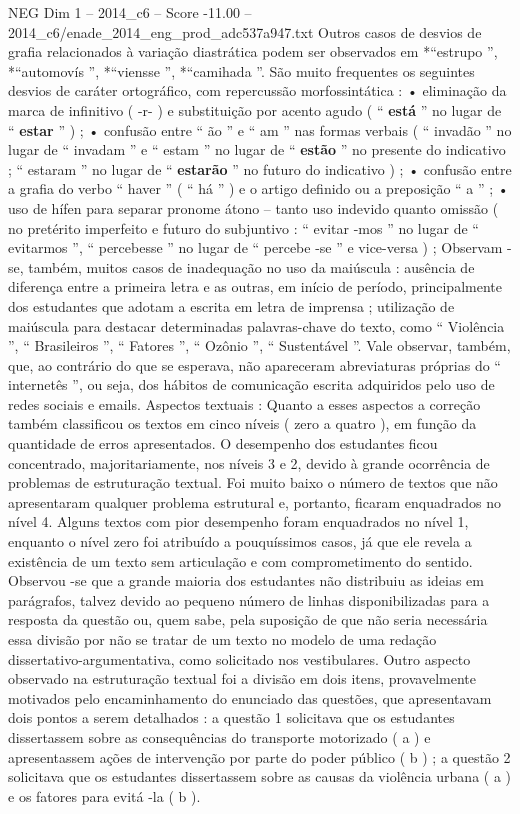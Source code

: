 \begin{textsample}{NEG Dim 1 – 2014\_c6 – Score -11.00 – 2014\_c6/enade\_2014\_eng\_prod\_adc537a947.txt}
Outros casos de desvios de grafia relacionados à variação diastrática podem ser observados em *“estrupo ”, *“automovís ”, *“viensse ”, *“camihada ”.
São muito frequentes os seguintes desvios de caráter ortográfico, com repercussão morfossintática : • eliminação da marca de infinitivo ( -r- ) e substituição por acento agudo ( “ \textbf{está} ” no lugar de “ \textbf{estar} ” ) ; • confusão entre “ ão ” e “ am ” nas formas verbais ( “ invadão ” no lugar de “ invadam ” e “ estam ” no lugar de “ \textbf{estão} ” no presente do indicativo ; “ estaram ” no lugar de “ \textbf{estarão} ” no futuro do indicativo ) ; • confusão entre a grafia do verbo “ haver ” ( “ há ” ) e o artigo definido ou a preposição “ a ” ; • uso de hífen para separar pronome átono – tanto uso indevido quanto omissão ( no pretérito imperfeito e futuro do subjuntivo : “ evitar -mos ” no lugar de “ evitarmos ”, “ percebesse ” no lugar de “ percebe -se ” e vice-versa ) ; Observam -se, também, muitos casos de inadequação no uso da maiúscula : ausência de diferença entre a primeira letra e as outras, em início de período, principalmente dos estudantes que adotam a escrita em letra de imprensa ; utilização de maiúscula para destacar determinadas palavras-chave do texto, como “ Violência ”, “ Brasileiros ”, “ Fatores ”, “ Ozônio ”, “ Sustentável ”.
Vale observar, também, que, ao contrário do que se esperava, não apareceram abreviaturas próprias do “ internetês ”, ou seja, dos hábitos de comunicação escrita adquiridos pelo uso de redes sociais e emails.
Aspectos textuais : Quanto a esses aspectos a correção também classificou os textos em cinco níveis ( zero a quatro ), em função da quantidade de erros apresentados.
O desempenho dos estudantes ficou concentrado, majoritariamente, nos níveis 3 e 2, devido à grande ocorrência de problemas de estruturação textual.
Foi muito baixo o número de textos que não apresentaram qualquer problema estrutural e, portanto, ficaram enquadrados no nível 4.
Alguns textos com pior desempenho foram enquadrados no nível 1, enquanto o nível zero foi atribuído a pouquíssimos casos, já que ele revela a existência de um texto sem articulação e com comprometimento do sentido.
Observou -se que a grande maioria dos estudantes não distribuiu as ideias em parágrafos, talvez devido ao pequeno número de linhas disponibilizadas para a resposta da questão ou, quem sabe, pela suposição de que não seria necessária essa divisão por não se tratar de um texto no modelo de uma redação dissertativo-argumentativa, como solicitado nos vestibulares.
Outro aspecto observado na estruturação textual foi a divisão em dois itens, provavelmente motivados pelo encaminhamento do enunciado das questões, que apresentavam dois pontos a serem detalhados : a questão 1 solicitava que os estudantes dissertassem sobre as consequências do transporte motorizado ( a ) e apresentassem ações de intervenção por parte do poder público ( b ) ; a questão 2 solicitava que os estudantes dissertassem sobre as causas da violência urbana ( a ) e os fatores para evitá -la ( b ).

\end{textsample}
